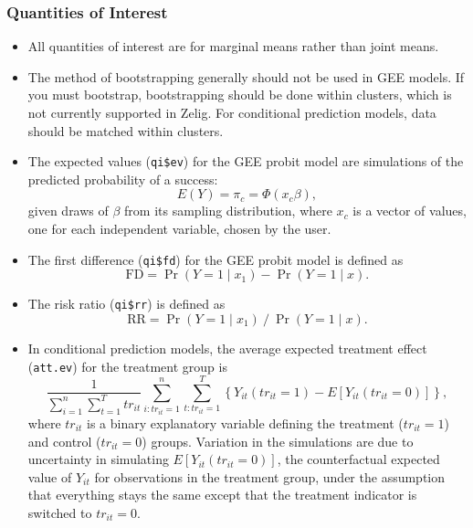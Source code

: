 \subsubsection{Quantities of Interest}
\begin{itemize}
\item All quantities of interest are for marginal means rather than joint means.
\item The method of bootstrapping generally should not be used in GEE models.  If you must bootstrap, bootstrapping should be done within clusters, which is not currently supported in Zelig.  For conditional prediction models, data should be matched within clusters.
\item The expected values ({\tt qi\$ev}) for the GEE probit model are
  simulations of the predicted probability of a success: $$E(Y) =
  \pi_{c}= \Phi(x_{c} \beta),$$ given draws of $\beta$ from
  its sampling distribution, where $x_{c}$ is a vector of values, one for
each independent variable, chosen by the user.

\item The first difference ({\tt qi\$fd}) for the GEE probit model is defined as
\begin{equation*}
\textrm{FD} = \Pr(Y = 1 \mid x_1) - \Pr(Y = 1 \mid x).
\end{equation*}

\item The risk ratio ({\tt qi\$rr}) is defined as
\begin{equation*}
\textrm{RR} = \Pr(Y = 1 \mid x_1) \ / \ \Pr(Y = 1 \mid x).
\end{equation*}

\item In conditional prediction models, the average expected treatment
  effect ({\tt att.ev}) for the treatment group is
    \begin{equation*} \frac{1}{\sum_{i=1}^n \sum_{t=1}^T tr_{it}}\sum_{i:tr_{it}=1}^n \sum_{t:tr_{it}=1}^T \left\{ Y_{it}(tr_{it}=1) -
      E[Y_{it}(tr_{it}=0)] \right\},
    \end{equation*}
    where $tr_{it}$ is a binary explanatory variable defining the treatment
    ($tr_{it}=1$) and control ($tr_{it}=0$) groups.  Variation in the
    simulations are due to uncertainty in simulating $E[Y_{it}(tr_{it}=0)]$,
    the counterfactual expected value of $Y_{it}$ for observations in the
    treatment group, under the assumption that everything stays the
    same except that the treatment indicator is switched to $tr_{it}=0$.

\end{itemize}

